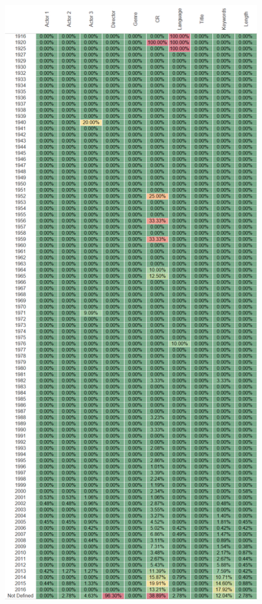 \documentclass{article}
\begin{document}
\begin{figure}[h]
\centering
\includegraphics[height=0.78\textheight,clip,keepaspectratio]{./images/dataset_quality_dimensions}
\label{fig:imdb_num_films_per_year}
\end{figure}
\end{document}
